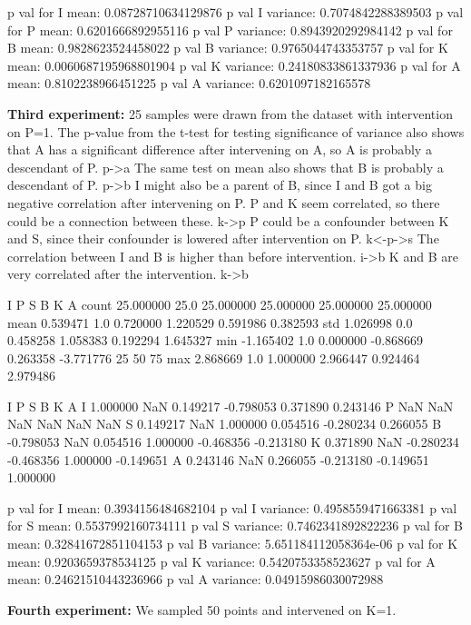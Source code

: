 \documentclass[12pt,fleqn,]{article}
\begin{document}
\begin{multicols}{2}
p val for I mean: 0.08728710634129876
p val I variance: 0.7074842288389503
p val for P mean: 0.6201666892955116
p val P variance: 0.8943920292984142
p val for B mean: 0.9828623524458022
p val B variance: 0.9765044743353757
p val for K mean: 0.0060687195968801904
p val K variance: 0.24180833861337936
p val for A mean: 0.8102238966451225
p val A variance: 0.6201097182165578


\textbf{Third experiment:} 25 samples were drawn from the dataset with intervention on P=1. 
The p-value from the t-test for testing significance of variance also shows that A has a significant difference after intervening on A, so A is probably a descendant of P. 
p->a
The same test on mean also shows that B is probably a descendant of P. 
p->b
I might also be a parent of B, since I and B got a big negative correlation after intervening on P.
P and K seem correlated, so there could be a connection between these.
k->p
P could be a confounder between K and S, since their confounder is lowered after intervention on P.
k<-p->s
The correlation between I and B is higher than before intervention.
i->b
K and B are very correlated after the intervention.
k->b


            I     P          S          B          K          A
count  25.000000  25.0  25.000000  25.000000  25.000000  25.000000
mean    0.539471   1.0   0.720000   1.220529   0.591986   0.382593
std     1.026998   0.0   0.458258   1.058383   0.192294   1.645327
min    -1.165402   1.0   0.000000  -0.868669   0.263358  -3.771776
25%
50%
75%
max     2.868669   1.0   1.000000   2.966447   0.924464   2.979486

          I   P         S         B         K         A
I  1.000000 NaN  0.149217 -0.798053  0.371890  0.243146
P       NaN NaN       NaN       NaN       NaN       NaN
S  0.149217 NaN  1.000000  0.054516 -0.280234  0.266055
B -0.798053 NaN  0.054516  1.000000 -0.468356 -0.213180
K  0.371890 NaN -0.280234 -0.468356  1.000000 -0.149651
A  0.243146 NaN  0.266055 -0.213180 -0.149651  1.000000

p val for I mean: 0.3934156484682104
p val I variance: 0.4958559471663381
p val for S mean: 0.5537992160734111
p val S variance: 0.7462341892822236
p val for B mean: 0.32841672851104153
p val B variance: 5.651184112058364e-06
p val for K mean: 0.9203659378534125
p val K variance: 0.5420753358523627
p val for A mean: 0.24621510443236966
p val A variance: 0.04915986030072988

\textbf{Fourth experiment:} We sampled 50 points and intervened on K=1. 


\end{multicols}		
\end{document}
